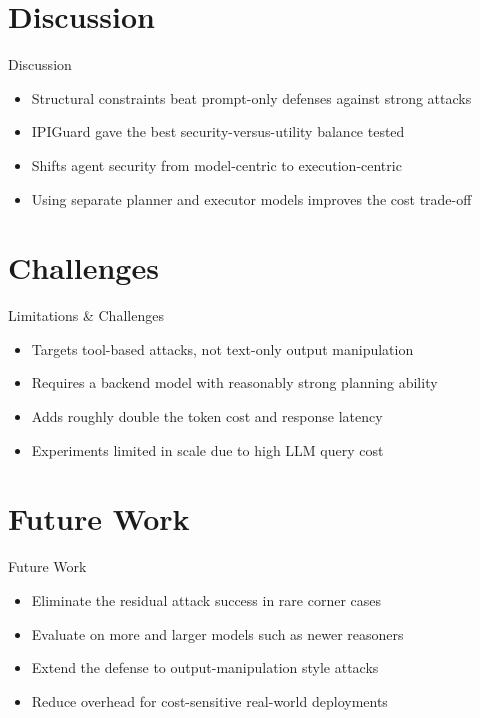 \documentclass[10pt]{beamer}
\begin{document}
\section{Discussion}
\begin{frame}{Discussion}
\begin{itemize}
  \item Structural constraints beat prompt-only defenses against strong attacks
  \item IPIGuard gave the best security-versus-utility balance tested
  \item Shifts agent security from model-centric to execution-centric
  \item Using separate planner and executor models improves the cost trade-off
\end{itemize}
\end{frame}

\section{Challenges}
\begin{frame}{Limitations \& Challenges}
\begin{itemize}
  \item Targets tool-based attacks, not text-only output manipulation
  \item Requires a backend model with reasonably strong planning ability
  \item Adds roughly double the token cost and response latency
  \item Experiments limited in scale due to high LLM query cost
\end{itemize}
\end{frame}

\section{Future Work}
\begin{frame}{Future Work}
\begin{itemize}
  \item Eliminate the residual attack success in rare corner cases
  \item Evaluate on more and larger models such as newer reasoners
  \item Extend the defense to output-manipulation style attacks
  \item Reduce overhead for cost-sensitive real-world deployments
\end{itemize}
\end{frame}
\end{document}
